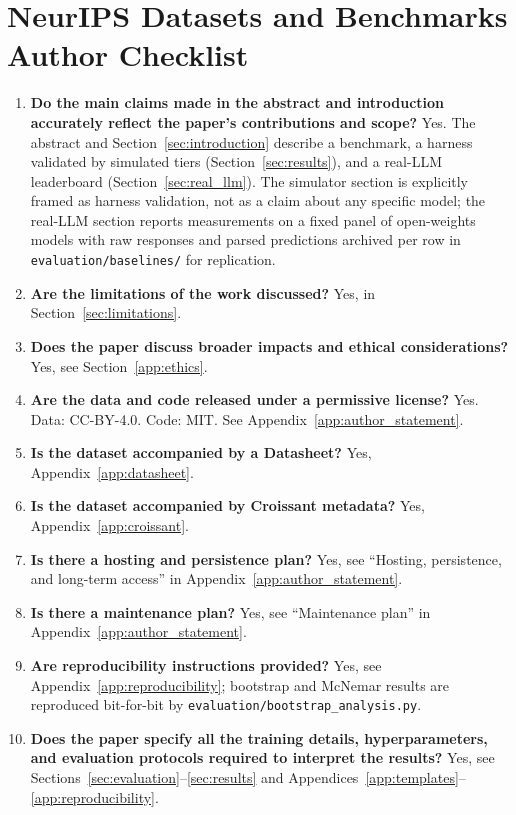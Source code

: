 \documentclass{article}
\begin{document}
\section{NeurIPS Datasets and Benchmarks Author Checklist}
\label{app:checklist}

\begin{enumerate}[leftmargin=*,itemsep=2pt]
    \item \textbf{Do the main claims made in the abstract and introduction accurately reflect the paper's contributions and scope?} Yes. The abstract and Section~\ref{sec:introduction} describe a benchmark, a harness validated by simulated tiers (Section~\ref{sec:results}), and a real-LLM leaderboard (Section~\ref{sec:real_llm}). The simulator section is explicitly framed as harness validation, not as a claim about any specific model; the real-LLM section reports measurements on a fixed panel of open-weights models with raw responses and parsed predictions archived per row in \texttt{evaluation/baselines/} for replication.
    \item \textbf{Are the limitations of the work discussed?} Yes, in Section~\ref{sec:limitations}.
    \item \textbf{Does the paper discuss broader impacts and ethical considerations?} Yes, see Section~\ref{app:ethics}.
    \item \textbf{Are the data and code released under a permissive license?} Yes. Data: CC-BY-4.0. Code: MIT. See Appendix~\ref{app:author_statement}.
    \item \textbf{Is the dataset accompanied by a Datasheet?} Yes, Appendix~\ref{app:datasheet}.
    \item \textbf{Is the dataset accompanied by Croissant metadata?} Yes, Appendix~\ref{app:croissant}.
    \item \textbf{Is there a hosting and persistence plan?} Yes, see ``Hosting, persistence, and long-term access'' in Appendix~\ref{app:author_statement}.
    \item \textbf{Is there a maintenance plan?} Yes, see ``Maintenance plan'' in Appendix~\ref{app:author_statement}.
    \item \textbf{Are reproducibility instructions provided?} Yes, see Appendix~\ref{app:reproducibility}; bootstrap and McNemar results are reproduced bit-for-bit by \texttt{evaluation/bootstrap\_analysis.py}.
    \item \textbf{Does the paper specify all the training details, hyperparameters, and evaluation protocols required to interpret the results?} Yes, see Sections~\ref{sec:evaluation}--\ref{sec:results} and Appendices~\ref{app:templates}--\ref{app:reproducibility}.

\end{enumerate}
\end{document}
